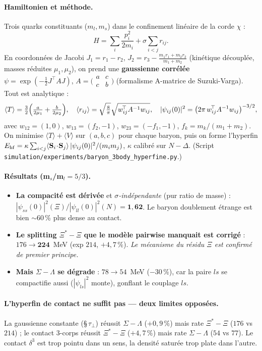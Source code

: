 \documentclass[11pt]{article}
\begin{document}
\paragraph{Hamiltonien et méthode.} Trois quarks constituants ($m_l,m_s$) dans le confinement linéaire de la corde $\chi$ :
\[
H=\sum_i\frac{p_i^2}{2m_i}+\sigma\!\!\sum_{i<j}r_{ij}.
\]
En coordonnées de Jacobi $J_1=r_1-r_2$, $J_2=r_3-\tfrac{m_1r_1+m_2r_2}{m_1+m_2}$ (kinétique découplée, masses réduites $\mu_1,\mu_2$), on prend une \textbf{gaussienne corrélée} $\psi=\exp(-\tfrac12 J^{\!\top}\!AJ)$, $A=\bigl(\begin{smallmatrix}a&c\\c&b\end{smallmatrix}\bigr)$ (formalisme A-matrice de Suzuki-Varga). Tout est analytique :
\[
\langle T\rangle=\tfrac32\Bigl(\tfrac{a}{2\mu_1}+\tfrac{b}{2\mu_2}\Bigr),\quad
\langle r_{ij}\rangle=\sqrt{\tfrac{8}{\pi}}\sqrt{w_{ij}^{\!\top}A^{-1}w_{ij}},\quad
|\psi_{ij}(0)|^2=\bigl(2\pi\,w_{ij}^{\!\top}A^{-1}w_{ij}\bigr)^{-3/2},
\]
avec $w_{12}=(1,0)$, $w_{13}=(f_2,-1)$, $w_{23}=(-f_1,-1)$, $f_k=m_k/(m_1{+}m_2)$. On minimise $\langle T\rangle+\langle V\rangle$ sur $(a,b,c)$ pour chaque baryon, puis on forme l'hyperfin $E_{\rm hf}=\kappa\sum_{i<j}\langle\mathbf{S}_i\!\cdot\!\mathbf{S}_j\rangle\,|\psi_{ij}(0)|^2/(m_im_j)$, $\kappa$ calibré sur $N{-}\Delta$. (Script \texttt{simulation/experiments/baryon\_3body\_hyperfine.py}.)

\paragraph{Résultats (m$_s$/m$_l=5/3$).}
\begin{itemize}\itemsep2pt
\item \textbf{La compacité est dérivée} et \emph{$\sigma$-indépendante} (pur ratio de masse) : $|\psi_{ss}(0)|^2(\Xi)/|\psi_{ll}(0)|^2(N)=\mathbf{1{,}62}$. Le baryon doublement étrange est bien $\sim$60\,\% plus dense au contact.
\item \textbf{Le splitting $\Xi^*{-}\Xi$ que le modèle pairwise manquait est corrigé} : $176\to\mathbf{224}$~MeV (exp $214$, $+4{,}7\,\%$). \emph{Le mécanisme du résidu $\Xi$ est confirmé de premier principe.}
\item \textbf{Mais $\Sigma{-}\Lambda$ se dégrade} : $78\to54$~MeV ($-30\,\%$), car la paire $ls$ se compactifie aussi ($|\psi_{ls}|^2$ monte), gonflant le couplage $ls$.
\end{itemize}

\paragraph{L'hyperfin de contact ne suffit pas --- deux limites opposées.} La gaussienne constante (\S\,$\tau_\perp$) réussit $\Sigma{-}\Lambda$ ($+0{,}9\,\%$) mais rate $\Xi^*{-}\Xi$ ($176$ vs $214$) ; le contact 3-corps réussit $\Xi^*{-}\Xi$ ($+4{,}7\,\%$) mais rate $\Sigma{-}\Lambda$ ($54$ vs $77$). Le contact $\delta^3$ est trop pointu dans un sens, la densité saturée trop plate dans l'autre.
\end{document}
